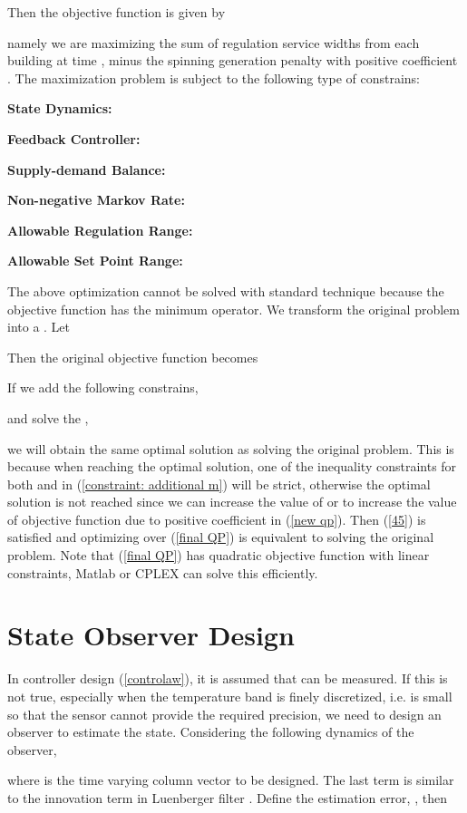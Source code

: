 \documentclass[journal]{IEEEtran}
\begin{document}
Then the objective function is given by

namely we are maximizing the sum of  regulation service widths from each building at time , minus the spinning generation penalty  with positive coefficient . The maximization problem is subject to the following type of constrains:

\textbf{State Dynamics:}


\textbf{Feedback Controller:}


\textbf{Supply-demand Balance:}


\textbf{Non-negative Markov Rate:}


\textbf{Allowable Regulation Range:}


\textbf{Allowable Set Point Range:}

The above optimization cannot be solved with standard technique because the objective function has the minimum operator. We transform the original problem into a . Let

Then the original objective function becomes

If we add the following constrains,

and solve the ,

we will obtain the same optimal solution as solving the original problem. This is because when reaching the optimal solution, one of the inequality constraints for both  and  in (\ref{constraint: additional m}) will be strict, otherwise the optimal solution is not reached since we can increase the value of  or  to increase the value of objective function due to positive coefficient  in (\ref{new qp}). Then (\ref{45}) is satisfied and optimizing over (\ref{final QP}) is equivalent to solving the original problem. Note that (\ref{final QP}) has quadratic objective function with linear constraints, Matlab or CPLEX can solve this  efficiently.

\section{State Observer Design}
\label{state observer design}
In controller design (\ref{controlaw}), it is assumed that  can be measured. If this is not true, especially when the temperature band is finely discretized, i.e.  is small so that the sensor cannot provide the required precision, we need to design an observer to estimate the state. Considering the following dynamics of the observer,

where  is the time varying column vector to be designed. The last term is similar to the innovation term in Luenberger filter \cite{kalmanfilter}. Define the estimation error, , then
\end{document}
